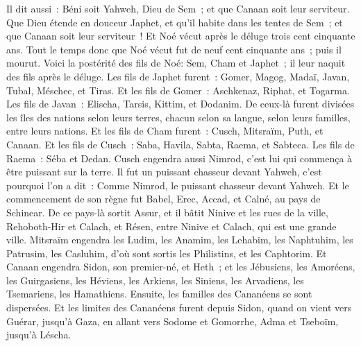 \begin{multicols}{2}
Il dit aussi~: Béni soit Yahweh, Dieu de Sem~; et que Canaan soit leur serviteur.
Que Dieu étende en douceur Japhet, et qu'il habite dans les tentes de Sem~; et que Canaan soit leur serviteur~!
Et Noé vécut après le déluge trois cent cinquante ans.
Tout le temps donc que Noé vécut fut de neuf cent cinquante ans~; puis il mourut.
\VerseOne{}Voici la postérité des fils de Noé: Sem, Cham et Japhet~; il leur naquit des fils après le déluge.
Les fils de Japhet furent~: Gomer, Magog, Madaï, Javan, Tubal, Méschec, et Tiras.
Et les fils de Gomer~: Aschkenaz, Riphat, et Togarma.
Les fils de Javan~: Elischa, Tarsis, Kittim, et Dodanim.
De ceux-là furent divisées les îles des nations selon leurs terres, chacun selon sa langue, selon leurs familles, entre leurs nations.
Et les fils de Cham furent~: Cusch, Mitsraïm, Puth, et Canaan.
Et les fils de Cusch~: Saba, Havila, Sabta, Raema, et Sabteca. Les fils de Raema~: Séba et Dedan.
Cusch engendra aussi Nimrod, c'est lui qui commença à être puissant sur la terre.
Il fut un puissant chasseur devant Yahweh, c'est pourquoi l'on a dit~: Comme Nimrod, le puissant chasseur devant Yahweh.
Et le commencement de son règne fut Babel, Erec, Accad, et Calné, au pays de Schinear.
De ce pays-là sortit Assur, et il bâtit Ninive et les rues de la ville, Rehoboth-Hir et Calach,
et Résen, entre Ninive et Calach, qui est une grande ville.
Mitsraïm engendra les Ludim, les Anamim, les Lehabim, les Naphtuhim,
les Patrusim, les Casluhim, d'où sont sortis les Philistins, et les Caphtorim.
Et Canaan engendra Sidon, son premier-né, et Heth~;
et les Jébusiens, les Amoréens, les Guirgasiens,
les Héviens, les Arkiens, les Siniens,
les Arvadiens, les Tsemariens, les Hamathiens. Ensuite, les familles des Cananéens se sont dispersées.
Et les limites des Cananéens furent depuis Sidon, quand on vient vers Guérar, jusqu'à Gaza, en allant vers Sodome et Gomorrhe, Adma et Tseboïm, jusqu'à Léscha.

\end{multicols}

